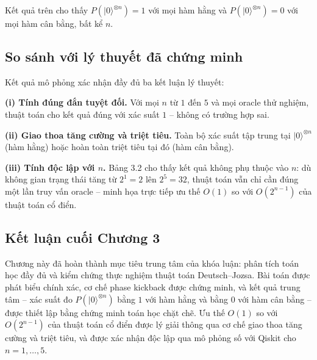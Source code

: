 Kết quả trên cho thấy $P(|0\rangle^{\otimes n}) = 1$
với mọi hàm hằng và $P(|0\rangle^{\otimes n}) = 0$ với mọi hàm cân bằng,
bất kể $n$.

\subsection*{So sánh với lý thuyết đã chứng minh}

Kết quả mô phỏng xác nhận đầy đủ ba kết luận lý thuyết:

\textbf{(i) Tính đúng đắn tuyệt đối.} Với mọi $n$ từ $1$ đến $5$ và mọi
oracle thử nghiệm, thuật toán cho kết quả đúng với xác suất $1$ -- không
có trường hợp sai.

\textbf{(ii) Giao thoa tăng cường và triệt tiêu.} Toàn bộ xác suất tập trung tại
$|0\rangle^{\otimes n}$ (hàm hằng) hoặc hoàn toàn triệt tiêu tại đó (hàm
cân bằng).

\textbf{(iii) Tính độc lập với $n$.} Bảng 3.2 cho thấy kết
quả không phụ thuộc vào $n$: dù không gian trạng thái tăng từ $2^1 = 2$
lên $2^5 = 32$, thuật toán vẫn chỉ cần đúng một lần truy vấn oracle --
minh họa trực tiếp ưu thế $O(1)$ so với $O(2^{n-1})$ của thuật toán cổ
điển.

\subsection*{Kết luận cuối Chương 3}
Chương này đã hoàn thành mục tiêu trung tâm của khóa luận: phân tích
toán học đầy đủ và kiểm chứng thực nghiệm thuật toán Deutsch--Jozsa.
Bài toán được phát biểu chính xác, cơ chế phase kickback được chứng minh,
và kết quả trung tâm -- xác suất đo $P(|0\rangle^{\otimes n})$ bằng $1$
với hàm hằng và bằng $0$ với hàm cân bằng -- được thiết lập bằng chứng
minh toán học chặt chẽ. Ưu thế $O(1)$ so với $O(2^{n-1})$ của thuật toán
cổ điển được lý giải thông qua cơ chế giao thoa tăng cường và triệt tiêu,
và được xác nhận độc lập qua mô phỏng số với Qiskit cho $n = 1, \ldots, 5$.